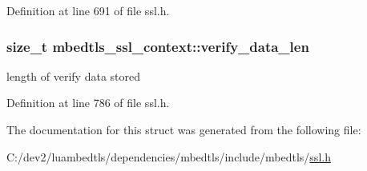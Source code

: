 Definition at line 691 of file ssl.\-h.

\hypertarget{structmbedtls__ssl__context_a06b667bf3672f8d480f962970c5adc7d}{
\subsubsection[{verify\-\_\-data\-\_\-len}]{\setlength{\rightskip}{0pt plus 5cm}size\-\_\-t mbedtls\-\_\-ssl\-\_\-context\-::verify\-\_\-data\-\_\-len}}\label{structmbedtls__ssl__context_a06b667bf3672f8d480f962970c5adc7d}
length of verify data stored 

Definition at line 786 of file ssl.\-h.



The documentation for this struct was generated from the following file\-:\begin{DoxyCompactItemize}
\item 
C\-:/dev2/luambedtls/dependencies/mbedtls/include/mbedtls/\hyperlink{ssl_8h}{ssl.\-h}\end{DoxyCompactItemize}
